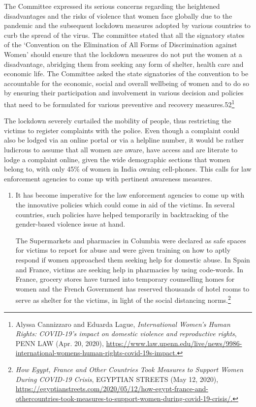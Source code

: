 \begin{multicols}{2}

\noi
The Committee expressed its serious concerns regarding the heightened disadvantages and
the risks of violence that women face globally due to the pandemic and the subsequent
lockdown measures adopted by various countries to curb the spread of the virus. The
committee stated that all the signatory states of the ‘Convention on the Elimination of All
Forms of Discrimination against Women’ should ensure that the lockdown measures do not
put the women at a disadvantage, abridging them from seeking any form of shelter, health
care and economic life. The Committee asked the state signatories of the convention to be
accountable for the economic, social and overall wellbeing of women and to do so by
ensuring their participation and involvement in various decision and policies that need to be
formulated for various preventive and recovery measures.52\footnote{Alyssa Cannizzaro and Eduarda Lague, \textit{International Women’s Human Rights: COVID-19’s impact on
domestic violence and reproductive rights}, PENN LAW (Apr. 20, 2020),
\url{https://www.law.upenn.edu/live/news/9986-international-womens-human-rights-covid-19s-impact.}}


\noi
The lockdown severely curtailed the mobility of people, thus restricting the victims to register
complaints with the police. Even though a complaint could also be lodged via an online portal
or via a helpline number, it would be rather ludicrous to assume that all women are aware,
have access and are literate to lodge a complaint online, given the wide demographic sections
that women belong to, with only 45\% of women in India owning cell-phones. This calls for
law enforcement agencies to come up with pertinent awareness measures.

\begin{enumerate}

\item It has become imperative for the law enforcement agencies to come up with the
innovative policies which could come in aid of the victims. In several countries, such
policies have helped temporarily in backtracking of the gender-based violence issue at
hand.

The Supermarkets and pharmacies in Columbia were declared as safe spaces for
victims to report for abuse and were given training on how to aptly respond if women
approached them seeking help for domestic abuse. In Spain and France, victims are
seeking help in pharmacies by using code-words. In France, grocery stores have turned into temporary counselling homes for women and the French Government has
reserved thousands of hotel rooms to serve as shelter for the victims, in light of the
social distancing norms.\footnote{\textit{How Egypt, France and Other Countries Took Measures to Support Women During COVID-19 Crisis},
EGYPTIAN STREETS (May 12, 2020), \url{https://egyptianstreets.com/2020/05/12/how-egypt-france-and-othercountries-took-measures-to-support-women-during-covid-19-crisis/.}}


\end{enumerate}
\end{multicols}
